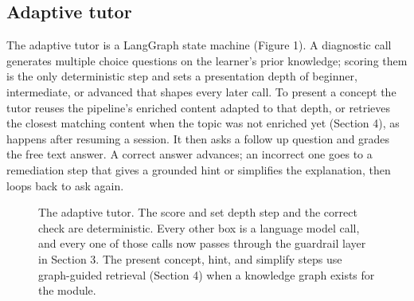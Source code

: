 \documentclass{ecai}
\begin{document}
\subsection{Adaptive tutor}

The adaptive tutor is a LangGraph state machine (Figure 1). A diagnostic call
generates multiple choice questions on the learner's prior knowledge; scoring
them is the only deterministic step and sets a presentation depth of beginner,
intermediate, or advanced that shapes every later call. To present a concept the
tutor reuses the pipeline's enriched content adapted to that depth, or retrieves
the closest matching content when the topic was not enriched yet (Section 4), as
happens after resuming a session. It then asks a follow up question and grades
the free text answer. A correct answer advances; an incorrect one goes to a
remediation step that gives a grounded hint or simplifies the explanation, then
loops back to ask again.

\begin{figure}[t]
\centering
{}
\caption{The adaptive tutor. The score and set depth step and the correct
check are deterministic. Every other box is a language model call, and every
one of those calls now passes through the guardrail layer in Section 3. The
present concept, hint, and simplify steps use graph-guided retrieval
(Section 4) when a knowledge graph exists for the module.}
\label{fig:tutor}
\end{figure}
\end{document}
